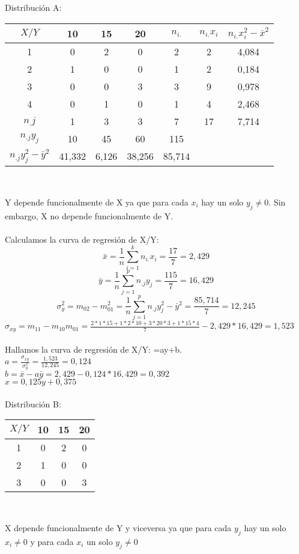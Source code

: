 \documentclass{article}
\begin{document}
    Distribución A: 
    \begin{center}
    \begin{tabular}{| c | c | c | c | c | c | c |}
        \hline
        $X / Y$ & 10 & 15 & 20 & $n_{i.}$ & $n_{i.}x_i$ & $n_{i.}x_i^2 - \bar{x}^2$ \\ \hline
        1 & 0 & 2 & 0 & 2 & 2 & 4,084 \\
        2 & 1 & 0 & 0 & 1 & 2 & 0,184 \\
        3 & 0 & 0 & 3 & 3 & 9 & 0,978 \\
        4 & 0 & 1 & 0 & 1 & 4 & 2,468 \\
        $n_.j$ & 1 & 3 & 3 & 7 & 17 & 7,714\\  
        $n_{.j}y_j$ & 10 & 45 & 60 & 115 & & \\
        $n_{.j}y_j^2 - \bar{y}^2$ & 41,332 & 6,126 & 38,256 & 85,714 & & \\
        \hline
    \end{tabular} \\ 
    \end{center}
    Y depende funcionalmente de X ya que para cada $x_i$ hay un solo $y_j\neq 0$. Sin embargo, X no depende funcionalmente de Y. \\ \\
    Calculamos la curva de regresión de X/Y: 
    \[\bar{x} = \frac{1}{n}\sum_{i=1}^{k}n_{i.}x_i = \frac{17}{7} = 2,429 \]
    \[\bar{y} = \frac{1}{n}\sum_{j=1}^{p}n_{.j}y_j = \frac{115}{7} = 16,429 \]
    \[\sigma_y^2 = m_{02}-m_{01}^2 = \frac{1}{n}\sum_{j=1}^{p}n_{.j}y_j^2-\bar{y}^2 = \frac{85,714}{7} = 12,245\]
    $\sigma_{xy} = m_{11}-m_{10}m_{01} = \frac{2*1*15+1*2*10+3*20*3+1*15*4}{7} - 2,429*16,429 = 1,523$ \\ \\
    Hallamos la curva de regresión de X/Y: =ay+b. \\
    $a = \frac{\sigma_{xy}}{\sigma_y^2} = \frac{1,523}{12,245} = 0,124$ \\
    $b = \bar{x}-a\bar{y} = 2,429 - 0,124*16,429 = 0,392$ \\
    $x=0,125y + 0,375$ \\ \\ 
    
    Distribución B: 
    \begin{center}
    \begin{tabular}{| c | c | c | c |}
        \hline
        $X / Y$ & 10 & 15 & 20 \\ \hline
        1 & 0 & 2 & 0 \\
        2 & 1 & 0 & 0 \\
        3 & 0 & 0 & 3 \\
        \hline
    \end{tabular} \\ 
    \end{center}
    X depende funcionalmente de Y y viceversa ya que para cada $y_j$ hay un solo $x_i\neq 0$ y para cada $x_i$ un solo $y_j\neq 0$ \\ \\
    
\end{document}
